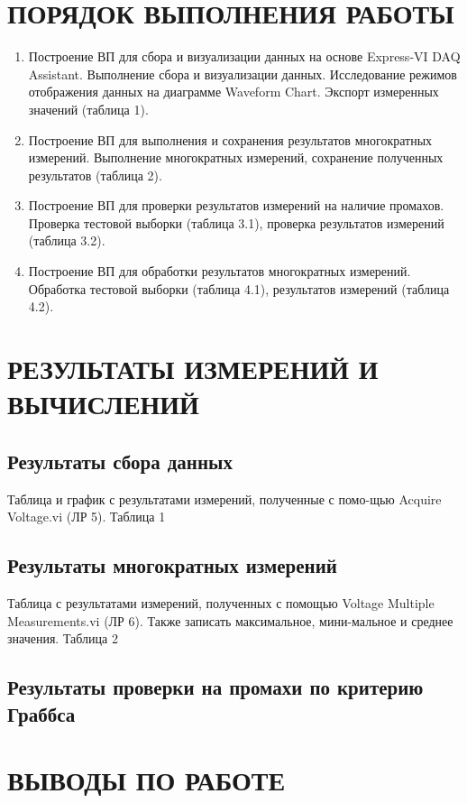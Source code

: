 \documentclass[a4paper,14pt]{article}
\begin{document}
\section{ПОРЯДОК ВЫПОЛНЕНИЯ РАБОТЫ}
\begin{enumerate}
\item     Построение ВП для сбора и визуализации данных на основе Express-VI DAQ Assistant.
 Выполнение сбора и визуализации данных.
 Исследование режимов отображения данных на диаграмме Waveform Chart.
 Экспорт измеренных значений (таблица 1).
\item     Построение ВП для выполнения и сохранения результатов многократных измерений.
 Выполнение многократных измерений, сохранение полученных результатов (таблица 2).
\item     Построение ВП для проверки результатов измерений на наличие промахов.
Проверка тестовой выборки (таблица 3.1), проверка результатов измерений (таблица  3.2).
\item     Построение ВП для обработки результатов многократных измерений.
Обработка тестовой выборки (таблица 4.1), результатов измерений (таблица 4.2).
\end{enumerate}

\section{ РЕЗУЛЬТАТЫ ИЗМЕРЕНИЙ И ВЫЧИСЛЕНИЙ}

\subsection{Результаты сбора данных}
Таблица и график с результатами измерений, полученные с помо-щью Acquire Voltage.vi (ЛР 5).
Таблица 1
\subsection{Результаты многократных измерений}

Таблица с результатами измерений, полученных с помощью Voltage Multiple Measurements.vi (ЛР 6). Также записать максимальное, мини-мальное и среднее значения.
Таблица 2
\subsection{Результаты проверки на промахи по критерию Граббса}

\section{ВЫВОДЫ ПО РАБОТЕ}
\end{document}
